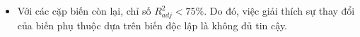 \documentclass[a4paper, 12pt]{article}
\begin{document}
\begin{itemize}
\begin{itemize}
            \item Với các cặp biến còn lại, chỉ số $R_{adj}^2 < 75\%$. Do đó, việc giải thích sự thay đổi của biến phụ thuộc dựa trên biến độc lập là không đủ tin cậy.




\end{itemize}
\end{itemize}
\end{document}
